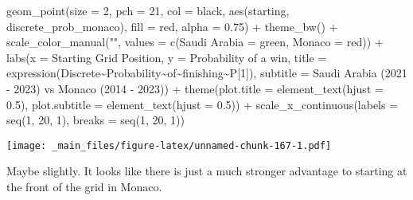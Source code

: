 \documentclass[
]{book}
\newenvironment{Shaded}{\begin{snugshade}}{\end{snugshade}}
\newcommand{\AttributeTok}[1]{\textcolor[rgb]{0.77,0.63,0.00}{#1}}
\newcommand{\DecValTok}[1]{\textcolor[rgb]{0.00,0.00,0.81}{#1}}
\newcommand{\FloatTok}[1]{\textcolor[rgb]{0.00,0.00,0.81}{#1}}
\newcommand{\FunctionTok}[1]{\textcolor[rgb]{0.00,0.00,0.00}{#1}}
\newcommand{\NormalTok}[1]{#1}
\newcommand{\OtherTok}[1]{\textcolor[rgb]{0.56,0.35,0.01}{#1}}
\newcommand{\SpecialCharTok}[1]{\textcolor[rgb]{0.00,0.00,0.00}{#1}}
\newcommand{\StringTok}[1]{\textcolor[rgb]{0.31,0.60,0.02}{#1}}
\begin{document}
\begin{Shaded}
\begin{Highlighting}[]
  \FunctionTok{geom\_point}\NormalTok{(}\AttributeTok{size =} \DecValTok{2}\NormalTok{, }\AttributeTok{pch =} \DecValTok{21}\NormalTok{, }\AttributeTok{col =} \StringTok{\textquotesingle{}black\textquotesingle{}}\NormalTok{, }\FunctionTok{aes}\NormalTok{(starting, discrete\_prob\_monaco), }\AttributeTok{fill =} \StringTok{\textquotesingle{}red\textquotesingle{}}\NormalTok{, }\AttributeTok{alpha =} \FloatTok{0.75}\NormalTok{) }\SpecialCharTok{+}
  \FunctionTok{theme\_bw}\NormalTok{() }\SpecialCharTok{+}
  \FunctionTok{scale\_color\_manual}\NormalTok{(}\StringTok{""}\NormalTok{, }\AttributeTok{values =} \FunctionTok{c}\NormalTok{(}\StringTok{\textquotesingle{}Saudi Arabia\textquotesingle{}} \OtherTok{=} \StringTok{\textquotesingle{}green\textquotesingle{}}\NormalTok{, }\StringTok{\textquotesingle{}Monaco\textquotesingle{}} \OtherTok{=} \StringTok{\textquotesingle{}red\textquotesingle{}}\NormalTok{)) }\SpecialCharTok{+}
  \FunctionTok{labs}\NormalTok{(}\AttributeTok{x =} \StringTok{\textquotesingle{}Starting Grid Position\textquotesingle{}}\NormalTok{,}
       \AttributeTok{y =} \StringTok{\textquotesingle{}Probability of a win\textquotesingle{}}\NormalTok{,}
       \AttributeTok{title =} \FunctionTok{expression}\NormalTok{(Discrete}\SpecialCharTok{\textasciitilde{}}\NormalTok{Probability}\SpecialCharTok{\textasciitilde{}}\NormalTok{of}\SpecialCharTok{\textasciitilde{}}\NormalTok{finishing}\SpecialCharTok{\textasciitilde{}}\NormalTok{P[}\DecValTok{1}\NormalTok{]),}
       \AttributeTok{subtitle =} \StringTok{\textquotesingle{}Saudi Arabia (2021 {-} 2023) vs Monaco (2014 {-} 2023)\textquotesingle{}}\NormalTok{) }\SpecialCharTok{+}
  \FunctionTok{theme}\NormalTok{(}\AttributeTok{plot.title =} \FunctionTok{element\_text}\NormalTok{(}\AttributeTok{hjust =} \FloatTok{0.5}\NormalTok{),}
        \AttributeTok{plot.subtitle =} \FunctionTok{element\_text}\NormalTok{(}\AttributeTok{hjust =} \FloatTok{0.5}\NormalTok{)) }\SpecialCharTok{+}
  \FunctionTok{scale\_x\_continuous}\NormalTok{(}\AttributeTok{labels =} \FunctionTok{seq}\NormalTok{(}\DecValTok{1}\NormalTok{, }\DecValTok{20}\NormalTok{, }\DecValTok{1}\NormalTok{),}
                     \AttributeTok{breaks =} \FunctionTok{seq}\NormalTok{(}\DecValTok{1}\NormalTok{, }\DecValTok{20}\NormalTok{, }\DecValTok{1}\NormalTok{))}
\end{Highlighting}
\end{Shaded}

\texttt{[image: \_main\_files/figure-latex/unnamed-chunk-167-1.pdf]}

Maybe slightly. It looks like there is just a much stronger advantage to starting at the front of the grid in Monaco.
\end{document}
